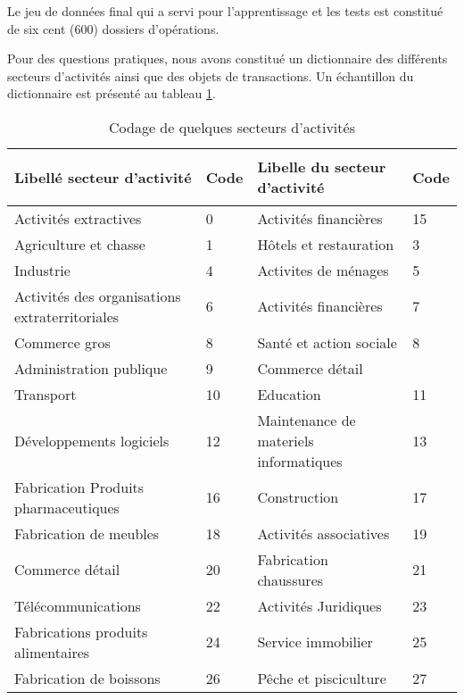 Le jeu de données final qui a servi pour l'apprentissage et les tests  est constitué de
six cent (600) dossiers d'opérations.


Pour des questions pratiques, nous avons constitué un dictionnaire des
différents secteurs d'activités ainsi que des objets de transactions.
Un échantillon du dictionnaire est présenté au tableau \ref{tab:codage}.
\begin{table}
 \begin{center}
    \begin{scriptsize}
      \renewcommand{\arraystretch}{2}
      \begin{tabular}{|m{5cm}|m{2cm}||m{5cm}|m{2cm}|}
        \hline
        \rowcolor[gray]{.7}
        \bf \rule[-0.4cm]{0mm}{1cm} Libellé secteur d'activité & \bf Code &
        \bf Libelle du secteur d'activité & \bf Code \\
        \hline

      Activités extractives & 0 &  Activités financières & 15 \\
      Agriculture et chasse & 1 & Hôtels et restauration & 3 \\
      Industrie & 4 & Activites de ménages & 5 \\
      Activités des organisations extraterritoriales & 6 & Activités financières & 7 \\
      Commerce gros & 8 & Santé et action sociale & 8 \\
      Administration publique & 9 & Commerce détail\\
      Transport & 10 & Education & 11 \\
      Développements logiciels & 12 & Maintenance de materiels informatiques & 13\\
      Fabrication Produits pharmaceutiques & 16 & Construction & 17 \\
      Fabrication de meubles & 18 & Activités associatives & 19 \\
      Commerce détail & 20 & Fabrication chaussures & 21 \\
      Télécommunications & 22 & Activités Juridiques & 23 \\
      Fabrications produits alimentaires & 24 & Service immobilier & 25 \\
      Fabrication de boissons & 26 & Pêche et pisciculture & 27 \\
        \hline
      \end{tabular}
      \end{scriptsize}
      \caption{Codage de quelques secteurs d'activités\label{tab:codage}}
  \end{center}
\end{table}
